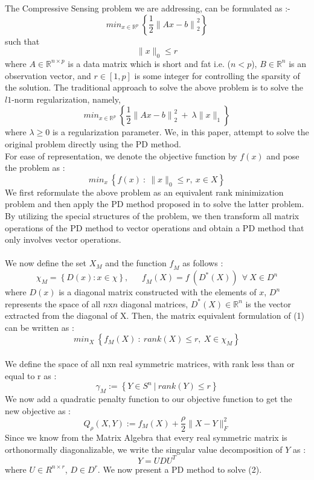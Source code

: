 \documentclass[letterpaper, 10 pt, conference]{article}
\begin{document}
The Compressive Sensing problem we are addressing, can be formulated as :-
$$min_{x\in{\mathbb{R}^{\textit{p}}}}\ \left\lbrace\frac{1}{2} {\|Ax-b \|}_{2}^{2}\right\rbrace$$
such that
$$\|x\|_0\leq r$$
where $A\in \mathbb{R}^{n \times p}$ is a data matrix which is short and fat i.e. ($n<p$), $B\in \mathbb{R}^n$ is an observation vector, and $r\in [1, p]$ is some integer for controlling the sparsity of the solution. The traditional approach to solve the above problem is to solve the $l1$-norm regularization, namely,
$$min_{x\in{\mathbb{R}^{\textit{p}}}}\ \left\lbrace\frac{1}{2} {\|Ax-b \|}_{2}^{2}\ +\ \lambda\|x\|_1\right\rbrace$$
where $\lambda\geq 0$ is a regularization parameter. We, in this paper, attempt to solve the original problem directly using the PD method.
\\
For ease of representation, we denote the objective function by $f(x)$ and pose the problem as :
\begin{equation}
min_{x}\ \left\lbrace{f(x)\ :\ \|x\|_0\leq r,\ x\in{\textit{X}}}\right\rbrace 
\end{equation}
We first reformulate the above problem as an equivalent rank minimization problem and then apply the PD method proposed in \cite{pd} to solve the latter problem. By utilizing the special structures of the problem, we then transform all matrix operations of the PD method to vector operations and obtain a PD method that only involves vector operations.
\\ \\
We now define the set $\textit{X}_M$ and the function $\textit{f}_M$ as follows :
$$\chi_M = \left\lbrace{{D(x):x\in{\chi}}}\right\rbrace,\ \ \ \ \ \ \ \textit{f}_M(X)=\textit{f}\ ({\textit{D}}^{\ast}(X))\ \ \forall\ X\in{D^n}$$ 
where $D(x)$ is a diagonal matrix constructed with the elements of $x$, $D^n$ represents the space of all $n$x$n$ diagonal matrices, $D^{\ast}(X)\in{\mathbb{R}^n}$ is the vector extracted from the diagonal of X. Then, the matrix equivalent formulation of (1) can be written as :
\begin{equation}
min_{X}\ \left\lbrace{f_M(X)\ :\ rank(X)\leq r,\ X\in{{\chi}_M}}\right\rbrace 
\end{equation}
\\
We define the space of all nxn real symmetric matrices, with rank less than or equal to r as :
$$\gamma_M := \left\lbrace{Y\in{S^n}\ |\ rank(Y)\leq{r}}\right\rbrace$$
We now add a quadratic penalty function to our objective function to get the new objective as :
$$Q_{\rho}(X,Y):=f_M(X)+\frac{\rho}{2}\|X-Y\|_{F}^{2}$$
Since we know from the Matrix Algebra that every real symmetric matrix is orthonormally diagonalizable, we write the singular value decomposition of $Y$ as :
$$Y=UDU^{T}$$
where $U\in{R^{n \times r}}$, $D\in{D^r}$. We now present a PD method to solve (2).
\newpage
\end{document}
